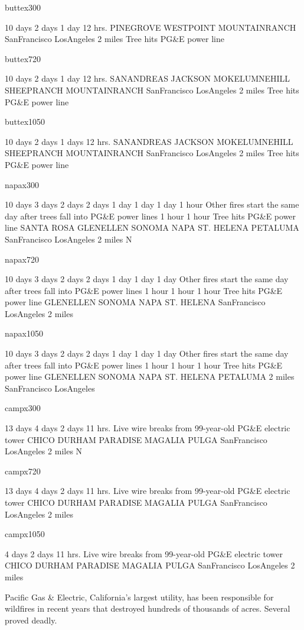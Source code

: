 buttex300

10 days 2 days 1 day 12 hrs. PINEGROVE WESTPOINT MOUNTAINRANCH
SanFrancisco LosAngeles 2 miles Tree hits PG\&E power line

buttex720

10 days 2 days 1 day 12 hrs. SANANDREAS JACKSON MOKELUMNEHILL SHEEPRANCH
MOUNTAINRANCH SanFrancisco LosAngeles 2 miles Tree hits PG\&E power line

buttex1050

10 days 2 days 1 days 12 hrs. SANANDREAS JACKSON MOKELUMNEHILL
SHEEPRANCH MOUNTAINRANCH SanFrancisco LosAngeles 2 miles Tree hits PG\&E
power line

napax300

10 days 3 days 2 days 2 days 1 day 1 day 1 day 1 hour Other fires start
the same day after trees fall into PG\&E power lines 1 hour 1 hour Tree
hits PG\&E power line SANTA ROSA GLENELLEN SONOMA NAPA ST. HELENA
PETALUMA SanFrancisco LosAngeles 2 miles N

napax720

10 days 3 days 2 days 2 days 1 day 1 day 1 day Other fires start the
same day after trees fall into PG\&E power lines 1 hour 1 hour 1 hour
Tree hits PG\&E power line GLENELLEN SONOMA NAPA ST. HELENA SanFrancisco
LosAngeles 2 miles

napax1050

10 days 3 days 2 days 2 days 1 day 1 day 1 day Other fires start the
same day after trees fall into PG\&E power lines 1 hour 1 hour 1 hour
Tree hits PG\&E power line GLENELLEN SONOMA NAPA ST. HELENA PETALUMA 2
miles SanFrancisco LosAngeles

campx300

13 days 4 days 2 days 11 hrs. Live wire breaks from 99-year-old PG\&E
electric tower CHICO DURHAM PARADISE MAGALIA PULGA SanFrancisco
LosAngeles 2 miles N

campx720

13 days 4 days 2 days 11 hrs. Live wire breaks from 99-year-old PG\&E
electric tower CHICO DURHAM PARADISE MAGALIA PULGA SanFrancisco
LosAngeles 2 miles

campx1050

4 days 2 days 11 hrs. Live wire breaks from 99-year-old PG\&E electric
tower CHICO DURHAM PARADISE MAGALIA PULGA SanFrancisco LosAngeles 2
miles

Pacific Gas \& Electric, California's largest utility, has been
responsible for wildfires in recent years that destroyed hundreds of
thousands of acres. Several proved deadly.

